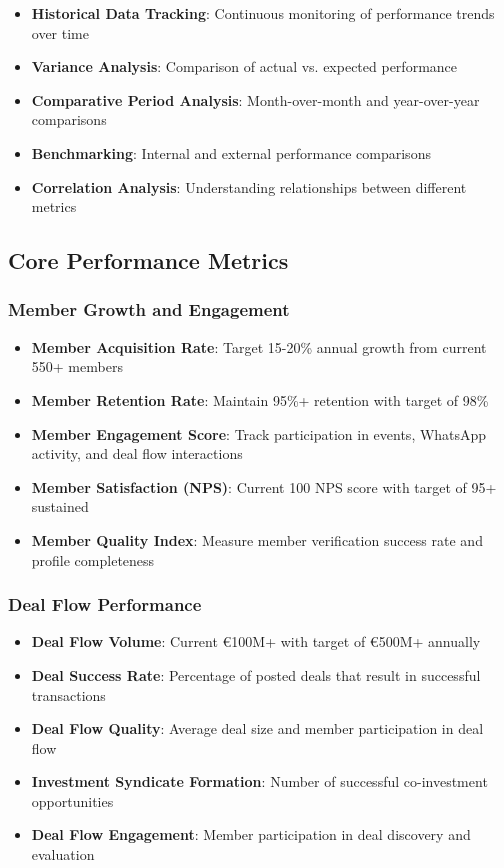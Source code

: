 \begin{itemize}
    \item \textbf{Historical Data Tracking}: Continuous monitoring of performance trends over time
    \item \textbf{Variance Analysis}: Comparison of actual vs. expected performance
    \item \textbf{Comparative Period Analysis}: Month-over-month and year-over-year comparisons
    \item \textbf{Benchmarking}: Internal and external performance comparisons
    \item \textbf{Correlation Analysis}: Understanding relationships between different metrics
\end{itemize}

\subsection{Core Performance Metrics}

\subsubsection{Member Growth and Engagement}
\begin{itemize}
    \item \textbf{Member Acquisition Rate}: Target 15-20\% annual growth from current 550+ members
    \item \textbf{Member Retention Rate}: Maintain 95\%+ retention with target of 98\%
    \item \textbf{Member Engagement Score}: Track participation in events, WhatsApp activity, and deal flow interactions
    \item \textbf{Member Satisfaction (NPS)}: Current 100 NPS score with target of 95+ sustained
    \item \textbf{Member Quality Index}: Measure member verification success rate and profile completeness
\end{itemize}

\subsubsection{Deal Flow Performance}
\begin{itemize}
    \item \textbf{Deal Flow Volume}: Current €100M+ with target of €500M+ annually
    \item \textbf{Deal Success Rate}: Percentage of posted deals that result in successful transactions
    \item \textbf{Deal Flow Quality}: Average deal size and member participation in deal flow
    \item \textbf{Investment Syndicate Formation}: Number of successful co-investment opportunities
    \item \textbf{Deal Flow Engagement}: Member participation in deal discovery and evaluation
\end{itemize}

